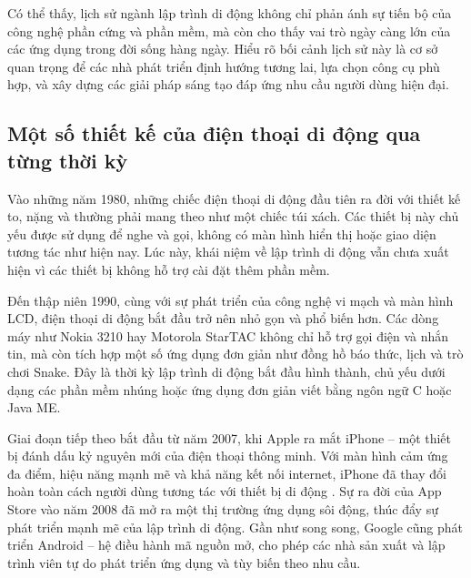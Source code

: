 \begin{flushleft}
  \hspace*{0.8cm}Có thể thấy, lịch sử ngành lập trình di động không chỉ phản ánh sự tiến bộ của công nghệ phần cứng và phần mềm, mà còn cho thấy vai trò ngày càng lớn của các ứng dụng trong đời sống hàng ngày. Hiểu rõ bối cảnh lịch sử này là cơ sở quan trọng để các nhà phát triển định hướng tương lai, lựa chọn công cụ phù hợp, và xây dựng các giải pháp sáng tạo đáp ứng nhu cầu người dùng hiện đại.
\end{flushleft}

\subsection{Một số thiết kế của điện thoại di động qua từng thời kỳ}
\renewcommand{\labelitemi}{--}    
    \begin{flushleft}
        \hspace*{0.8cm}Vào những năm 1980, những chiếc điện thoại di động đầu tiên ra đời với thiết kế to, nặng và thường phải mang theo như một chiếc túi xách. Các thiết bị này chủ yếu được sử dụng để nghe và gọi, không có màn hình hiển thị hoặc giao diện tương tác như hiện nay. Lúc này, khái niệm về lập trình di động vẫn chưa xuất hiện vì các thiết bị không hỗ trợ cài đặt thêm phần mềm.
    \end{flushleft}

    \begin{flushleft}
      \hspace*{0.8cm}Đến thập niên 1990, cùng với sự phát triển của công nghệ vi mạch và màn hình LCD, điện thoại di động bắt đầu trở nên nhỏ gọn và phổ biến hơn. Các dòng máy như Nokia 3210 hay Motorola StarTAC không chỉ hỗ trợ gọi điện và nhắn tin, mà còn tích hợp một số ứng dụng đơn giản như đồng hồ báo thức, lịch và trò chơi Snake. Đây là thời kỳ lập trình di động bắt đầu hình thành, chủ yếu dưới dạng các phần mềm nhúng hoặc ứng dụng đơn giản viết bằng ngôn ngữ C hoặc Java ME.
  \end{flushleft}

  \begin{flushleft}
    \hspace*{0.8cm}Giai đoạn tiếp theo bắt đầu từ năm 2007, khi Apple ra mắt iPhone – một thiết bị đánh dấu kỷ nguyên mới của điện thoại thông minh. Với màn hình cảm ứng đa điểm, hiệu năng mạnh mẽ và khả năng kết nối internet, iPhone đã thay đổi hoàn toàn cách người dùng tương tác với thiết bị di động \cite{iphone2007}. Sự ra đời của App Store vào năm 2008 đã mở ra một thị trường ứng dụng sôi động, thúc đẩy sự phát triển mạnh mẽ của lập trình di động. Gần như song song, Google cũng phát triển Android – hệ điều hành mã nguồn mở, cho phép các nhà sản xuất và lập trình viên tự do phát triển ứng dụng và tùy biến theo nhu cầu.
\end{flushleft}

